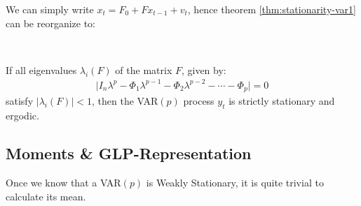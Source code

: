 We can simply write $x_t = F_0 + F x_{t-1} + v_t$,
hence theorem \ref{thm:stationarity-var1} can be reorganize to:
\begin{theorem}\label{thm:stationarity-varp-2}
    \

    If all eigenvalues $\lambda_i(F)$ of the matrix $F$, given by:
    \begin{gather*}
        \vert I_n \lambda^p - \Phi_1 \lambda^{p-1} - \Phi_2 \lambda^{p-2} - \cdots - \Phi_p \vert = 0
    \end{gather*}
    satisfy $\vert \lambda_i(F) \vert < 1$,
    then the VAR$(p)$ process $y_t$ is strictly stationary and ergodic.
\end{theorem}

\subsection{Moments \& GLP-Representation}
Once we know that a VAR$(p)$ is Weakly Stationary, it is quite trivial to calculate its mean.

